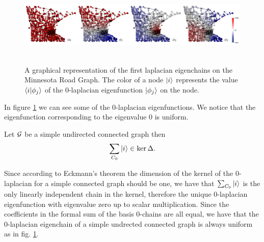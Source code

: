\documentclass[../2.tex]{subfiles}
\begin{document}
\begin{figure}[H]
    \centering
    \includegraphics[width=17cm, height=4cm]{sections/2/eiglap}
    \caption{A graphical representation of the first laplacian eigenchains on the Minnesota Road Graph.
    The color of a node $| i \rangle$ represents the value $\langle i | \phi_j \rangle$ of the $0$-laplacian eigenfunction $| \phi_j \rangle$
    on the node.}
    \label{fig:2:5}
\end{figure}

In figure \ref{fig:2:5} we can see some of the $0$-laplacian eigenfunctions. We notice that the eigenfunction corresponding to the eigenvalue $0$ is uniform.

\begin{prop}
    Let $\mathcal{G}$ be a simple undirected connected graph then 
    \[ \sum_{C_0} | i \rangle \in \ker\Delta. \]
\end{prop}

Since according to Eckmann's theorem the dimension of the kernel of the $0$-laplacian for a simple connected graph should be one, 
we have that $\sum_{C_0} | i \rangle$ is the only linearly independent chain in the kernel, therefore the unique $0$-laplacian eigenfunction
with eigenvalue zero up to scalar multiplication. Since the coefficients in the formal sum of the basis $0$-chains are all equal, we have that the $0$-laplacian eigenchain
of a simple undrected connected graph is always uniform as in fig. \ref{fig:2:5}.

    
\end{document}
